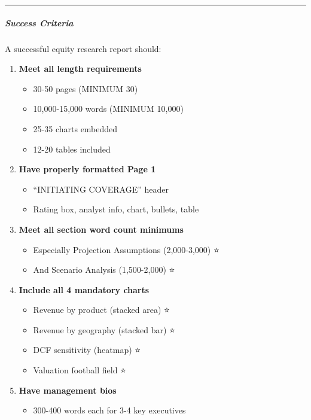 \documentclass[11pt]{article}
\begin{document}
\vspace{0.5em}\hrule\vspace{0.5em}

\subparagraph{Success Criteria}\mbox{}\par

A successful equity research report should:


\begin{enumerate}[leftmargin=*,itemsep=2pt,topsep=2pt]
\item {} \textbf{Meet all length requirements}
\begin{itemize}[leftmargin=*,itemsep=2pt,topsep=2pt]
\item {} 30-50 pages (MINIMUM 30)
\item {} 10,000-15,000 words (MINIMUM 10,000)
\item {} 25-35 charts embedded
\item {} 12-20 tables included
\end{itemize}
\item {} \textbf{Have properly formatted Page 1}
\begin{itemize}[leftmargin=*,itemsep=2pt,topsep=2pt]
\item {} ``INITIATING COVERAGE'' header
\item {} Rating box, analyst info, chart, bullets, table
\end{itemize}
\item {} \textbf{Meet all section word count minimums}
\begin{itemize}[leftmargin=*,itemsep=2pt,topsep=2pt]
\item {} Especially Projection Assumptions (2,000-3,000) ⭐
\item {} And Scenario Analysis (1,500-2,000) ⭐
\end{itemize}
\item {} \textbf{Include all 4 mandatory charts}
\begin{itemize}[leftmargin=*,itemsep=2pt,topsep=2pt]
\item {} Revenue by product (stacked area) ⭐
\item {} Revenue by geography (stacked bar) ⭐
\item {} DCF sensitivity (heatmap) ⭐
\item {} Valuation football field ⭐
\end{itemize}
\item {} \textbf{Have management bios}
\begin{itemize}[leftmargin=*,itemsep=2pt,topsep=2pt]
\item {} 300-400 words each for 3-4 key executives

\end{itemize}
\end{enumerate}
\end{document}
